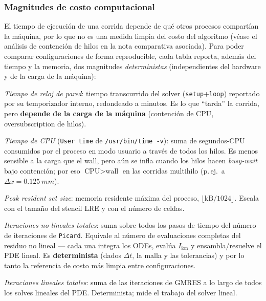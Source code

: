 \documentclass[11pt,a4paper]{article}
\newcommand{\code}[1]{\texttt{\small #1}}
\newcommand{\Iion}{I_{\mathrm{ion}}}
\begin{document}
\subsubsection{Magnitudes de costo computacional}
\label{sec:res2d:cost}

El tiempo de ejecución de una corrida depende de qué otros procesos compartían la
máquina, por lo que no es una medida limpia del costo del algoritmo (véase el
análisis de contención de hilos en la nota comparativa asociada). Para poder comparar
configuraciones de forma reproducible, cada tabla reporta, además del tiempo y la
memoria, dos magnitudes \emph{deterministas} (independientes del hardware y de la
carga de la máquina):

\begin{description}[topsep=2pt,itemsep=2pt,leftmargin=1.4em]
  \item[wall {[min]}] \emph{Tiempo de reloj de pared}: tiempo transcurrido del solver
        (\code{setup}+\code{loop}) reportado por su temporizador interno, redondeado a
        minutos. Es lo que ``tarda'' la corrida, pero \textbf{depende de la carga de
        la máquina} (contención de CPU, oversubscription de hilos).
  \item[CPU {[min]}] \emph{Tiempo de CPU} (\code{User time} de
        \texttt{/usr/bin/time -v}): suma de segundos-CPU consumidos por el proceso en
        modo usuario a través de todos los hilos. Es menos sensible a la carga que el
        wall, pero aún se infla cuando los hilos hacen \emph{busy-wait} bajo
        contención; por eso $\text{CPU}>\text{wall}$ en las corridas multihilo (p.\,ej.\
        a $\Delta x=\SI{0.125}{mm}$).
  \item[RSS {[MiB]}] \emph{Peak resident set size}: memoria residente máxima del
        proceso, $\lfloor\text{kB}/1024\rfloor$. Escala con el tamaño del stencil LRE
        y con el número de celdas.
  \item[$N_{\mathrm{nl}}$] \emph{Iteraciones no lineales totales}: suma sobre todos
        los pasos de tiempo del número de iteraciones de \code{Picard}. Equivale al
        número de evaluaciones completas del residuo no lineal --- cada una integra
        los ODEs, evalúa $\Iion$ y ensambla/resuelve el PDE lineal. Es
        \textbf{determinista} (dados $\Delta t$, la malla y las tolerancias) y por lo
        tanto la referencia de costo más limpia entre configuraciones.
  \item[$N_{\mathrm{lin}}$] \emph{Iteraciones lineales totales}: suma de las
        iteraciones de GMRES a lo largo de todos los solves lineales del PDE.
        Determinista; mide el trabajo del solver lineal.
\end{description}
\end{document}
